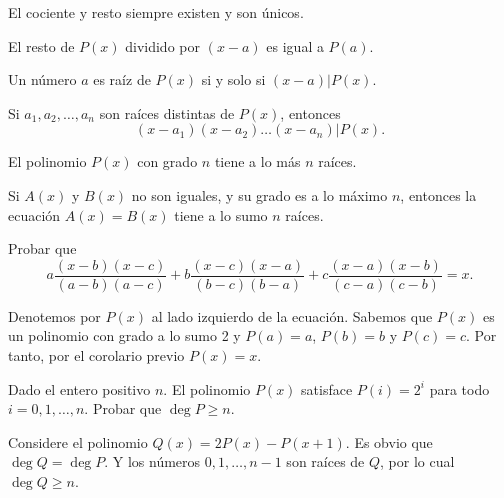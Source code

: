 \begin{theorem}
    El cociente y resto siempre existen y son únicos.
\end{theorem}

\begin{theorem}
    El resto de $P(x)$ dividido por $(x - a)$ es igual a $P(a)$.
\end{theorem}

\begin{theorem}
    Un número $a$ es raíz de $P(x)$ si y solo si $(x - a) | P(x)$.
\end{theorem}

\begin{corollary}
    Si $a_1, a_2, \ldots, a_n$ son raíces distintas de $P(x)$, entonces
    \[
        (x - a_1)(x - a_2)\ldots(x - a_n) | P(x).
    \]
\end{corollary}

\begin{theorem}
    El polinomio $P(x)$ con grado $n$ tiene a lo más $n$ raíces.
\end{theorem}

\begin{corollary}
    Si $A(x)$ y $B(x)$ no son iguales, y su grado es a lo máximo $n$, entonces la ecuación $A(x) = B(x)$ tiene a lo sumo $n$ raíces.
\end{corollary}

\begin{example}
    Probar que
    \[
        a \frac{(x - b)(x - c)}{(a - b)(a - c)} + b \frac{(x - c)(x - a)}{(b - c)(b - a)} + c \frac{(x - a)(x - b)}{(c - a)(c - b )} = x.
    \]
\end{example}

\begin{solution}
    Denotemos por $P(x)$ al lado izquierdo de la ecuación.
    Sabemos que $P(x)$ es un polinomio con grado a lo sumo 2 y $P(a) = a$, $P(b) = b$ y $P(c) = c$.
    Por tanto, por el corolario previo $P(x) = x$.
\end{solution}

\begin{example}
    Dado el entero positivo $n$.
    El polinomio $P(x)$ satisface $P(i) = 2^i$ para todo $i = 0, 1, \ldots, n$.
    Probar que $\deg{P} \geq n$.
\end{example}

\begin{solution}
    Considere el polinomio $Q(x) = 2P(x) - P(x + 1)$.
    Es obvio que $\deg{Q} = \deg{P}$.
    Y los números $0, 1, \ldots, n-1$ son raíces de $Q$, por lo cual $\deg{Q} \geq n$.
\end{solution}

